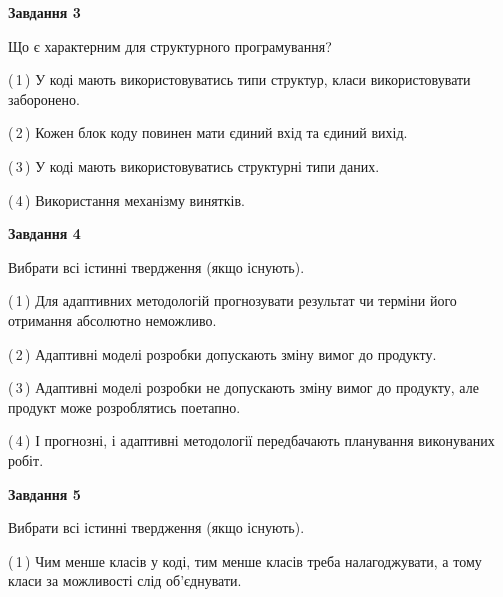 \documentclass[10pt, ukrainian]{article}
\begin{document}
{\begin {large}
{\begin {center}\textbf{Завдання 3}\end {center}}\par
Що є характерним для структурного програмування?\par
\vspace{2mm}



(\,1\,) У коді мають використовуватись типи структур, класи використовувати заборонено. %



(\,2\,) Кожен блок коду повинен мати єдиний вхід та єдиний вихід.%



(\,3\,) У коді мають використовуватись структурні типи даних. %



(\,4\,) Використання механізму винятків. %


{\begin {center}\textbf{Завдання 4}\end {center}}\par
Вибрати всі істинні твердження (якщо існують).\par
\vspace{2mm}



(\,1\,) Для адаптивних методологій прогнозувати результат чи терміни його отримання абсолютно неможливо. %



(\,2\,) Адаптивні моделі розробки допускають зміну вимог до продукту. %



(\,3\,) Адаптивні моделі розробки не допускають зміну вимог до продукту, але продукт може розроблятись поетапно. %



(\,4\,) І прогнозні, і адаптивні методології передбачають планування виконуваних робіт. %


{\begin {center}\textbf{Завдання 5}\end {center}}\par
Вибрати всі істинні твердження (якщо існують).\par
\vspace{2mm}



(\,1\,) Чим менше класів у коді, тим менше класів треба налагоджувати, а тому класи за можливості слід об'єднувати. %




\end{large}}
\end{document}
